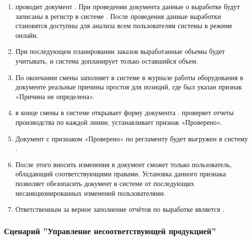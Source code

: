 \begin{enumerate}
\item	\operator  проводит документ . При проведении документа данные о выработке будут записаны в регистр  в системе \gofro. После проведения данные выработки становятся доступны для анализа всем пользователям системы \gofro в режиме онлайн.
\item	При последующем планировании заказов выработанные объемы \planner будет учитывать, и система \gofro допланирует только оставшийся объем.
\item	По окончании смены \operator  заполняет в системе \gofro в журнале работы оборудования в документе   реальные причины простоя для позиций, где был указан признак «Причина не определена».
\item	\master  в конце смены в системе \gofro открывает форму документа .  \master  проверяет отчеты производства по каждой линии, устанавливает признак «Проверено». 
\item	Документ  с признаком «Проверено» по регламенту будет выгружен в систему \erp.
\item	 После этого вносить изменения в документ сможет только пользователь, обладающий соответствующими правами. Установка данного признака позволяет обезопасить документ в системе \gofro от последующих несанкционированных изменений пользователями.
\item	Ответственным за верное заполнение отчётов по выработке является \master.



\end{enumerate}





\subsubsection{Сценарий ''Управление несоответствующей продукцией''}
\label{bp:production_30}


